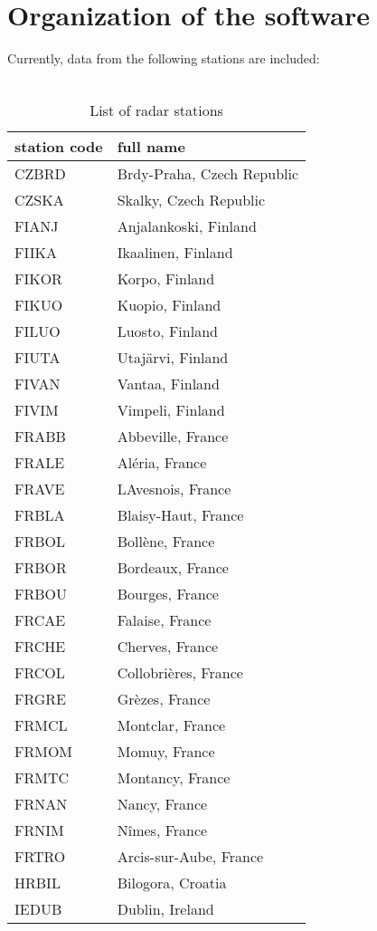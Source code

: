 \chapter{Organization of the software}
\label{ch:design-philosophy}


Currently, data from the following stations are included:\\
\\
\begin{longtable}[htb]{ll}
\caption{List of radar stations}
\hline
\textbf{station code} & \textbf{full name}\\
\hline
\endhead
CZBRD & Brdy-Praha, Czech Republic\\
CZSKA & Skalky, Czech Republic \\
FIANJ & Anjalankoski, Finland \\
FIIKA & Ikaalinen, Finland \\
FIKOR & Korpo, Finland \\
FIKUO & Kuopio, Finland \\
FILUO & Luosto, Finland \\
FIUTA & Utaj\"{a}rvi, Finland \\
FIVAN & Vantaa, Finland \\
FIVIM & Vimpeli, Finland \\
FRABB & Abbeville, France \\
FRALE & Al\'{e}ria, France \\
FRAVE & LAvesnois, France \\
FRBLA & Blaisy-Haut, France \\
FRBOL & Boll\`{e}ne, France \\
FRBOR & Bordeaux, France \\
FRBOU & Bourges, France \\
FRCAE & Falaise, France \\
FRCHE & Cherves, France \\
FRCOL & Collobri\`{e}res, France \\
FRGRE & Gr\`{e}zes, France \\
FRMCL & Montclar, France \\
FRMOM & Momuy, France \\
FRMTC & Montancy, France \\
FRNAN & Nancy, France \\
FRNIM & N\^{i}mes, France \\
FRTRO & Arcis-sur-Aube, France \\
HRBIL & Bilogora, Croatia \\
IEDUB & Dublin, Ireland  \\

\end{longtable}

